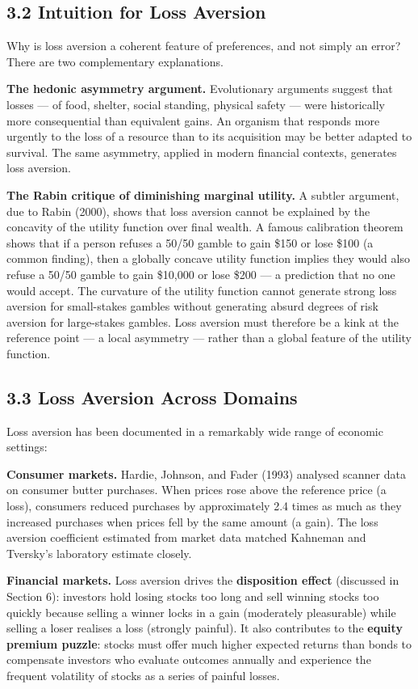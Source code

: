 \documentclass[12pt, letterpaper]{article}
\begin{document}
\subsection{3.2 Intuition for Loss Aversion}


Why is loss aversion a coherent feature of preferences, and not simply an error? There are two complementary explanations.

\textbf{The hedonic asymmetry argument.} Evolutionary arguments suggest that losses --- of food, shelter, social standing, physical safety --- were historically more consequential than equivalent gains. An organism that responds more urgently to the loss of a resource than to its acquisition may be better adapted to survival. The same asymmetry, applied in modern financial contexts, generates loss aversion.

\textbf{The Rabin critique of diminishing marginal utility.} A subtler argument, due to Rabin (2000), shows that loss aversion cannot be explained by the concavity of the utility function over final wealth. A famous calibration theorem shows that if a person refuses a 50/50 gamble to gain \$150 or lose \$100 (a common finding), then a globally concave utility function implies they would also refuse a 50/50 gamble to gain \$10,000 or lose \$200 --- a prediction that no one would accept. The curvature of the utility function cannot generate strong loss aversion for small-stakes gambles without generating absurd degrees of risk aversion for large-stakes gambles. Loss aversion must therefore be a kink at the reference point --- a local asymmetry --- rather than a global feature of the utility function.


\subsection{3.3 Loss Aversion Across Domains}


Loss aversion has been documented in a remarkably wide range of economic settings:

\textbf{Consumer markets.} Hardie, Johnson, and Fader (1993) analysed scanner data on consumer butter purchases. When prices rose above the reference price (a loss), consumers reduced purchases by approximately 2.4 times as much as they increased purchases when prices fell by the same amount (a gain). The loss aversion coefficient estimated from market data matched Kahneman and Tversky's laboratory estimate closely.

\textbf{Financial markets.} Loss aversion drives the \textbf{disposition effect} (discussed in Section 6): investors hold losing stocks too long and sell winning stocks too quickly because selling a winner locks in a gain (moderately pleasurable) while selling a loser realises a loss (strongly painful). It also contributes to the \textbf{equity premium puzzle}: stocks must offer much higher expected returns than bonds to compensate investors who evaluate outcomes annually and experience the frequent volatility of stocks as a series of painful losses.
\end{document}
